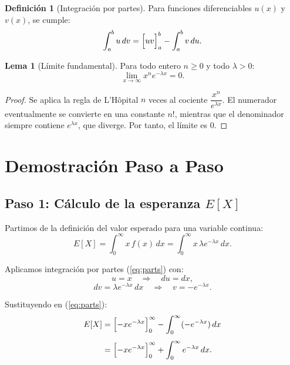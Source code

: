 \documentclass{article}
\theoremstyle{definition}
\newtheorem{definition}{Definición}
\newtheorem{lemma}{Lema}
\begin{document}
    \begin{definition}[Integración por partes]
    Para funciones diferenciables $u(x)$ y $v(x)$, se cumple:
    \begin{equation} \label{eq:parts}
        \int_a^b u \, dv = \Bigl[ u v \Bigr]_a^b - \int_a^b v \, du.
    \end{equation}
    \end{definition}

    \begin{lemma}[Límite fundamental] \label{lem:limite}
    Para todo entero $n \geq 0$ y todo $\lambda > 0$:
    \begin{equation}
        \lim_{x \to \infty} x^n e^{-\lambda x} = 0.
    \end{equation}
    \end{lemma}

    \begin{proof}
    Se aplica la regla de L'Hôpital $n$ veces al cociente $\dfrac{x^n}{e^{\lambda x}}$. El numerador eventualmente se convierte en una constante $n!$, mientras que el denominador siempre contiene $e^{\lambda x}$, que diverge. Por tanto, el límite es $0$.
    \end{proof}

    \section*{Demostración Paso a Paso}

    \subsection*{Paso 1: Cálculo de la esperanza $E[X]$}

    Partimos de la definición del valor esperado para una variable continua:
    $$ E[X] = \int_{0}^{\infty} x \, f(x) \, dx = \int_{0}^{\infty} x \, \lambda e^{-\lambda x} \, dx. $$

    Aplicamos integración por partes (\ref{eq:parts}) con:
    $$ u = x \quad \Rightarrow \quad du = dx, $$
    $$ dv = \lambda e^{-\lambda x} \, dx \quad \Rightarrow \quad v = -e^{-\lambda x}. $$

    Sustituyendo en (\ref{eq:parts}):
    \begin{align*}
        E[X] &= \Bigl[ -x e^{-\lambda x} \Bigr]_0^\infty - \int_{0}^{\infty} (-e^{-\lambda x}) \, dx \\[4pt]
             &= \Bigl[ -x e^{-\lambda x} \Bigr]_0^\infty + \int_{0}^{\infty} e^{-\lambda x} \, dx.
    \end{align*}
\end{document}
